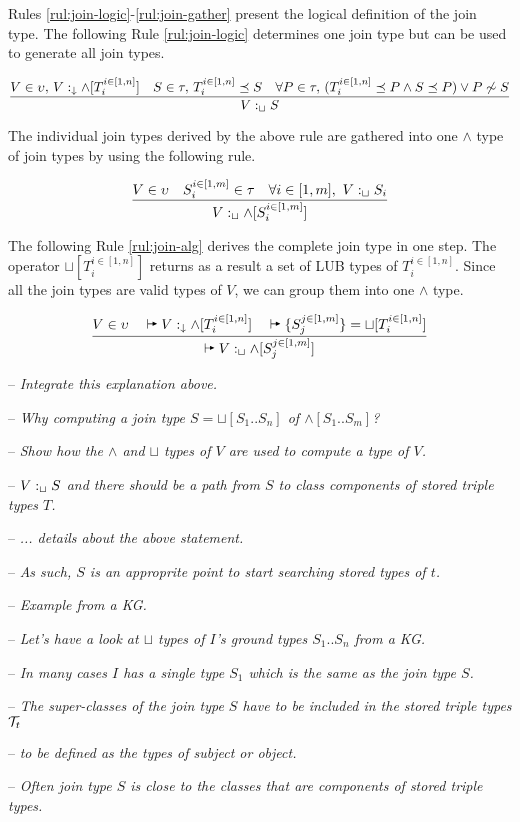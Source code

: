 \documentclass[runningheads]{llncs}
\newcommand{\darr}{\downarrow}
\newcommand{\llb}{\llbracket}
\newcommand{\rrb}{\rrbracket}
\newcommand{\vdasharr}{%
    \mathrel{%
        \vdash\hspace*{-5pt}%
        \raisebox{2.3pt}{\scalebox{.5}{\(\blacktriangleright\)}}%
    }%
}\newcommand{\D}{{\cal D}}
\newcommand{\T}{{\cal T}}
\newcommand{\notes}[1]{\noindent\begin{small}-- \emph{#1}\hfill\break\end{small}}
\newcommand{\nnotes}[1]{\indent\begin{small}-- \emph{#1}\hfill\break\end{small}}
\newcommand{\ennotes}[1]{\indent\begin{small}-- \emph{#1}\hfill\end{small}}
\begin{document}

Rules \ref{rul:join-logic}-\ref{rul:join-gather} present the logical
definition of the join type. The following Rule \ref{rul:join-logic}
determines one join type but can be used to generate all join types.


\begin{equation}
\label{rul:join-logic}
\dfrac{V\in\upsilon,\, \/V:_\darr\land[T_i^{i\in[1,n]}]\quad\/S\in\tau,\, T_i^{i\in[1,n]}\preceq\/S\quad\forall\/P\in\tau,\, (T_i^{i\in[1,n]}\preceq\/P\land\/S\preceq\/P)\lor\/P\not\sim\/S}
      {V:_\sqcup\/S}
\end{equation}

The individual join types derived by the above rule are gathered
into one $\land$ type of join types by using the following rule.

\begin{equation}
\label{rul:join-gather}
\dfrac{V\in\upsilon\quad\/S_i^{i\in[1,m]}\in\tau\quad\forall\/i\in[1,m],\ V:_\sqcup\/S_i}
{V:_{\sqcup}\land[S_i^{i\in[1,m]}]}
\end{equation}

The following Rule \ref{rul:join-alg} derives the complete join type
in one step. The operator $\sqcup[T_i^{i\in[1,n]}]$ returns as a
result a set of LUB types of $T_i^{i\in[1,n]}$. Since all the join types
are valid types of $V$, we can group them into one $\land$ type.

\begin{equation}
\label{rul:join-alg} 
\dfrac{V\in\upsilon\quad\vdasharr\/V:_\darr\land[T_i^{i\in[1,n]}]\quad\/\vdasharr\{S_j^{j\in[1,m]}\}=\sqcup[T_i^{i\in[1,n]}]}
      {\vdasharr\/V:_\sqcup\land[S_j^{j\in[1,m]}]}
\end{equation}

\notes{Integrate this explanation above.}
\notes{Why computing a join type $S=\sqcup[S_1..S_n]$ of $\land[S_1..S_m]$?}
\nnotes{Show how the $\land$ and $\sqcup$ types of $V$ are used to compute a type of $V$.}
\nnotes{$V:_\sqcup\/S$ and there should be a path from $S$ to class components of stored triple types $T$.}
\nnotes{... details about the above statement.}
\nnotes{As such, $S$ is an approprite point to start searching stored types of $t$.}

\notes{Example from a KG.}
\notes{Let's have a look at $\sqcup$ types of $I$'s ground types $S_1..S_n$ from a KG. }
\nnotes{In many cases $I$ has a single type $S_1$ which is the same as the join type $S$.}
\nnotes{The super-classes of the join type $S$ have to be included in the stored triple types $\T_t$}
\nnotes{to be defined as the types of subject or object.}
\nnotes{Often join type $S$ is close to the classes that are components of stored triple types.}
\end{document}
